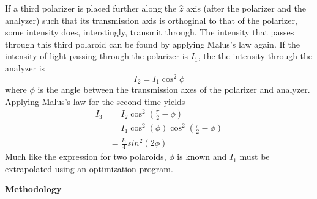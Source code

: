 \documentclass[11pt]{article}
\begin{document}
\begin{multicols}{2}
    If a third polarizer is placed further along the $\hat{z}$ axis (after the polarizer and the analyzer) such that its transmission axis is orthoginal to that of the polarizer, some intensity does, interstingly, transmit through. The intensity that passes through this third polaroid can be found by applying Malus's law again. If the intensity of light passing through the polarizer is $I_1$, the the intensity through the analyzer is
    \[
        I_2 = I_1 \cos^2 \phi
    \]
    where $\phi$ is the angle between the transmission axes of the polarizer and analyzer. Applying Malus's law for the second time yields
    \begin{equation}
        \begin{split}
            I_3 &= I_2 \cos^2 (\frac{\pi}{2} - \phi) \\
            &= I_1 \cos^2 (\phi) \cos^2 (\frac{\pi}{2} - \phi) \\
            & = \frac{I_1}{4} sin^2 (2 \phi) \label{MalusLaw3}
        \end{split}
    \end{equation}
    Much like the expression for two polaroids, $\phi$ is known and $I_1$ must be extrapolated using an optimization program. 
    


    \vspace{20pt}

     \selectfont \textbf{Methodology}
    
     \selectfont 


    

\end{multicols}
\end{document}
